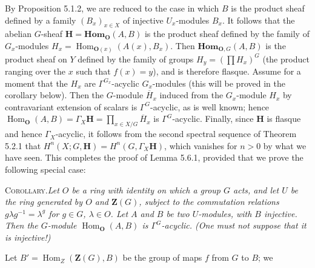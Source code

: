 By Proposition 5.1.2, we are reduced to the case in which $B$ is the product
sheaf defined by a family $(B_x)_{x\in X}$ of injective $U_x$-modules $B_x$.
It follows that the abelian $G$-sheaf
$\mathbf H=\mathbf{Hom}_{\mathbf O}(A,B)$ is the product sheaf defined by the family of
$G_x$-modules $H_x=\operatorname{Hom}_{{\mathbf O}(x)}(A(x),B_x)$.
Then $\mathbf{Hom}_{{\mathbf O},G}(A,B)$ is the product sheaf on $Y$ defined by the
family of groups
$H_y=\left(\displaystyle\prod H_x\right)^G$ (the product ranging over the $x$ such that $f(x)=y$), and is therefore flasque. Assume for a moment that the $H_x$ are
$\Gamma^{G_x}$-acyclic $G_x$-modules (this will be proved in the corollary
below).
Then the $G$-module $\overline H_x$ induced from the $G_x$-module $H_x$ by
contravariant extension of scalars is $\Gamma^G$-acyclic, as is well known;
hence
$\operatorname{Hom}_{\mathbf O}(A,B)=\Gamma_X\mathbf H
=\displaystyle\prod_{x\in X/G}\overline H_x
$ is $\Gamma^G$-acyclic. Finally, since $\mathbf H$ is flasque and hence $\Gamma_X$-acyclic, it follows
from the second spectral sequence of Theorem 5.2.1 that
$H^n(X;G,\mathbf H)=H^n(G,\Gamma_X\mathbf H)$, which vanishes for $n>0$ by what we have seen. This completes the
proof of Lemma 5.6.1, provided that we prove the following special case:

\textsc{Corollary.}\quad \textit{Let $O$ be a ring with identity on
which a group $G$ acts, and let $U$ be the ring generated by $O$ and
$\mathbf Z(G)$, subject to the commutation relations
$g\lambda g^{-1}=\lambda^g$ for $g\in G$, $\lambda\in O$. Let $A$ and $B$ be
two $U$-modules, with $B$ injective. Then the $G$-module
$\operatorname{Hom}_{\mathbf O}(A,B)$ is $\Gamma^G$-acyclic. (One must not suppose that
it is injective!)}

Let $B'=\operatorname{Hom}_{Z}(\mathbf Z(G),B)$ be the group of maps
$f$ from $G$ to $B$; we

